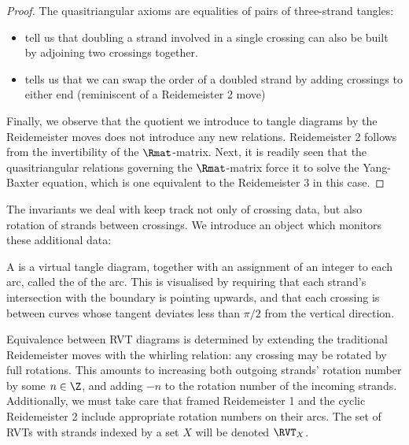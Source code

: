 \begin{proof}
        The quasitriangular axioms are equalities of pairs of three-strand
        tangles:
        \begin{itemize}
                \item {} tell us that
                        doubling a strand involved in a single crossing can also
                        be built by adjoining two crossings together.
                \item {} tells us that we can swap the order
                        of a doubled strand by adding crossings to either end
                        (reminiscent of a Reidemeister 2 move)
        \end{itemize}

        Finally, we observe that the quotient we introduce to tangle diagrams by
        the Reidemeister moves does not introduce any new relations.
        Reidemeister 2 follows from the invertibility of the $\Rmat$-matrix.
        Next, it is readily seen that the quasitriangular relations governing
        the $\Rmat$-matrix force it to solve the Yang-Baxter equation, which is
        one equivalent to the Reidemeister 3 in this case.
\end{proof}

The invariants we deal with keep track not only of crossing data, but also
rotation of strands between crossings. We introduce an object which monitors
these additional data:
\begin{definition}
        A  is a virtual tangle diagram, together with an
        assignment of an integer to each arc, called the 
        of the arc. This is visualised by requiring that each strand's
        intersection with the boundary is pointing upwards, and that each
        crossing is between curves whose tangent deviates less than $π/2$ from
        the vertical direction.

        Equivalence between \ac{RVT} diagrams is determined by extending the
        traditional Reidemeister moves with the whirling relation: any crossing
        may be rotated by full rotations. This amounts to increasing both
        outgoing strands' rotation number by some $n\in\Z$, and adding $-n$ to
        the rotation number of the incoming strands.
        Additionally, we must take care that framed Reidemeister 1 and the
        cyclic Reidemeister 2 include appropriate rotation numbers on their
        arcs. %
        The set of \acp{RVT} with strands indexed by a set $X$ will be denoted
        $\RVT_X$.
\end{definition}

